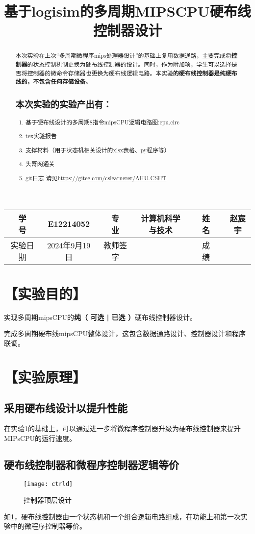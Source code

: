 \documentclass[withoutpreface]{cumcmthesis}
\title{基于logisim的多周期MIPSCPU硬布线控制器设计}
\begin{document}
\maketitle
\begin{tabular}{cccccc}
	\hline
	学　　号 & E12214052 &专　　业 & 计算机科学与技术 &姓　　名 & 赵宸宇 \\
	\hline
	实验日期 & 2024年9月19日 &教师签字 &  &成　　绩&\\
	\hline
\end{tabular}
\begin{abstract}
本次实验在上次“多周期微程序mips处理器设计”的基础上复用数据通路，主要完成将\textbf{控制器}的状态控制机制更换为硬布线控制器的设计。同时，作为附加项，学生可以选择是否将控制器的微命令存储器也更换为硬布线逻辑电路。本实验\textbf{的硬布线控制器是纯硬布线的，不包含任何存储设备}。

\subsection*{本次实验的实验产出有：}
\begin{enumerate}
	\item 基于硬布线设计的多周期8指令mipsCPU逻辑电路图:cpu.circ
	\item tex实验报告
	\item 支撑材料（用于状态机相关设计的xlsx表格、py程序等）
	\item 头哥网通关
	\item git日志 请见\url{https://gitee.com/cslearnerer/AHU-CSHT}
\end{enumerate}
\end{abstract}
\tableofcontents
\section{【实验目的】}
实现多周期mipsCPU的\textbf{纯（ 可选 | 已选 ）}硬布线控制器设计。

完成多周期硬布线mipsCPU整体设计，这包含数据通路设计、控制器设计和程序联调。
\section{【实验原理】}
\subsection{采用硬布线设计以提升性能}
在实验1的基础上，可以通过进一步将微程序控制器升级为硬布线控制器来提升MIPsCPU的运行速度。
\subsection{硬布线控制器和微程序控制器逻辑等价}
\begin{figure}[!h]
	\centering
	\texttt{[image: ctrld]}
	\caption{控制器顶层设计}
	\label{fig:ctrl-design}
\end{figure}
如\cref{fig:ctrl-design}，硬布线控制器由一个状态机和一个组合逻辑电路组成，在功能上和第一次实验中的微程序控制器等价。
\end{document}
